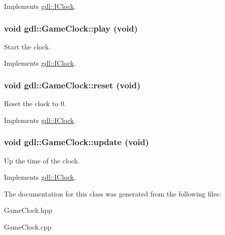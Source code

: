 Implements \hyperlink{classgdl_1_1IClock_a7274430efa1f0e621bcce5d99d6abca7}{gdl::IClock}.\hypertarget{classgdl_1_1GameClock_aa7ad30c03dec94bc5b21a4fcad290644}{
\subsubsection[{play}]{\setlength{\rightskip}{0pt plus 5cm}void gdl::GameClock::play (void)}}
\label{classgdl_1_1GameClock_aa7ad30c03dec94bc5b21a4fcad290644}
Start the clock. 

Implements \hyperlink{classgdl_1_1IClock_af9f70e18cd6b9b39aca1a359412adf4d}{gdl::IClock}.\hypertarget{classgdl_1_1GameClock_af568839e075e6e3c2b7aad91450d16d2}{
\subsubsection[{reset}]{\setlength{\rightskip}{0pt plus 5cm}void gdl::GameClock::reset (void)}}
\label{classgdl_1_1GameClock_af568839e075e6e3c2b7aad91450d16d2}
Reset the clock to 0. 

Implements \hyperlink{classgdl_1_1IClock_a63cd29fcd9830e719d4cb82d5e993ec6}{gdl::IClock}.\hypertarget{classgdl_1_1GameClock_adb1151b518f6ee38a169b25b75542311}{
\subsubsection[{update}]{\setlength{\rightskip}{0pt plus 5cm}void gdl::GameClock::update (void)}}
\label{classgdl_1_1GameClock_adb1151b518f6ee38a169b25b75542311}
Up the time of the clock. 

Implements \hyperlink{classgdl_1_1IClock_a0489f6f9055df40116e98e7ed6ad4146}{gdl::IClock}.

The documentation for this class was generated from the following files:\begin{DoxyCompactItemize}
\item 
GameClock.hpp\item 
GameClock.cpp\end{DoxyCompactItemize}
